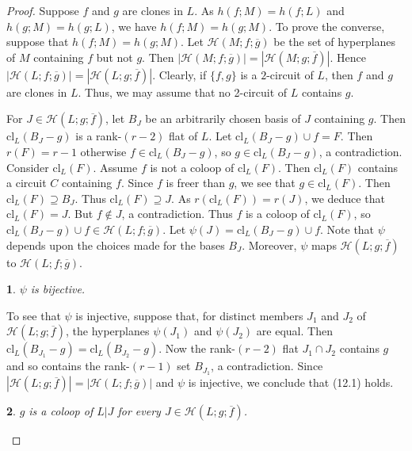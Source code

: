 \documentclass[12pt,reqno]{amsart}
\newtheorem{sublemma}{}[theorem]
\theoremstyle{definition}
\theoremstyle{remark}
\numberwithin{equation}{section}
\newcommand{\cl}{\text{cl}}
\begin{document}
\begin{proof}
    Suppose $f$ and $g$ are clones in $L$.
    As $h(f;M)=h(f;L)$ and $h(g;M)=h(g;L)$, we have $h(f;M)=h(g;M)$. 
    To prove the converse, suppose that $h(f;M)=h(g;M)$. 
    Let $\mathcal{H}(M;f;\overline g)$ be the set of hyperplanes of $M$ containing $f$ but not $g$. 
    Then $|\mathcal{H}(M;f;\overline g)|=|\mathcal{H}(M;g;\overline f)|$.
    Hence $|\mathcal{H}(L;f;\overline g)|=|\mathcal{H}(L;g;\overline f)|$.
    Clearly, if $\{f,g\}$ is a $2$-circuit of $L$, then $f$ and $g$ are clones in $L$. 
    Thus, we may assume that no 2-circuit of $L$ contains $g$.


    For $J\in \mathcal{H}(L;g;\overline f)$, let $B_J$ be an arbitrarily chosen basis of $J$ containing $g$. 
    Then $\cl_{L}(B_J-g)$ is a rank-$(r-2)$ flat of $L$. 
    Let $\cl_{L}(B_J-g)\cup f=F$. 
    Then $r(F)=r-1$ otherwise $f\in \cl_{L}(B_J-g)$, so $g\in \cl_{L}(B_J-g)$, a contradiction. 
    Consider $\cl_{L}(F)$. 
    Assume $f$ is not a coloop of $\cl_{L}(F)$. 
    Then $\cl_{L}(F)$ contains a circuit $C$ containing $f$. 
    Since $f$ is freer than $g$, we see that $g\in \cl_{L}(F)$. 
    Then $\cl_{L}(F)\supseteq B_J$. 
    Thus $\cl_{L}(F)\supseteq J$. 
    As $r(\cl_{L}(F))=r(J)$, we deduce that $\cl_{L}(F)=J$. 
    But $f\not\in J$, a contradiction. 
    Thus $f$ is a coloop of $\cl_{L}(F)$, so $\cl_{L}(B_J-g)\cup f\in \mathcal{H}(L;f;\overline g)$. 
    Let $\psi(J)=\cl_{L}(B_J-g)\cup f$. 
    Note that $\psi$ depends upon the choices made for the bases $B_J$. Moreover, $\psi$ maps $\mathcal{H}(L;g;\overline f)$ to $\mathcal{H}(L;f;\overline g )$.  

    \begin{sublemma}
       $\psi$ is bijective. 
    \end{sublemma}

    To see that $\psi$ is injective, suppose that, for distinct members $J_1$ and $J_2$ of $\mathcal{H}(L;g;\overline f)$, the hyperplanes $\psi(J_1)$ and $\psi(J_2)$ are equal. 
    Then $\cl_{L}(B_{J_1}-g)=\cl_{L}(B_{J_2}-g)$. 
    Now the rank-$(r-2)$ flat $J_1\cap J_2$ contains $g$ and so contains the rank-$(r-1)$ set $B_{J_1}$, a contradiction. 
    Since $|\mathcal{H}(L;g;\overline f)|=|\mathcal{H}(L;f;\overline g)|$ and $\psi$ is injective, we conclude that (12.1) holds.


    \begin{sublemma}
        $g$ is a coloop of $L|J$ for every $J\in \mathcal{H}(L;g;\overline f)$.  
    \end{sublemma}


\end{proof}
\end{document}
